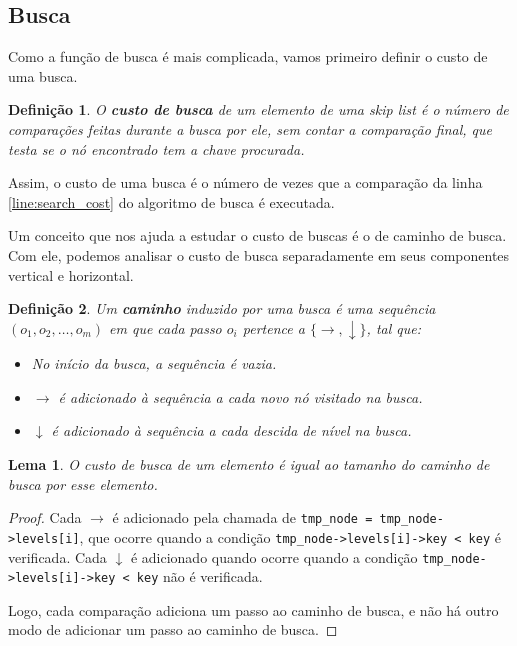 \documentclass[paper=a4, fontsize=11pt]{scrartcl} %
\newtheorem{definition}{Definição}
\newtheorem{lemma}[theorem]{Lema}
\numberwithin{equation}{section}
\numberwithin{figure}{section}
\numberwithin{table}{section}
\numberwithin{definition}{section}
\numberwithin{theorem}{section}
\numberwithin{property}{section}
\numberwithin{proposition}{section}
\renewcommand{\sl}{\textit{skip list}\xspace}
\begin{document}
\subsection{Busca}

Como a função de busca é mais complicada, vamos primeiro definir o custo de uma busca.

\begin{definition}

O \textbf{custo de busca} de um elemento de uma \sl é o número de comparações feitas durante a busca por ele, sem
contar a comparação final, que testa se o nó encontrado tem a chave procurada.

\end{definition}

Assim, o custo de uma busca é o número de vezes que a comparação da linha \ref{line:search_cost} do algoritmo
de busca é executada.

Um conceito que nos ajuda a estudar o custo de buscas é o de caminho de busca. Com ele, podemos analisar o
custo de busca separadamente em seus componentes vertical e horizontal.

\begin{definition}

Um \textbf{caminho} induzido por uma busca é uma sequência $(o_1, o_2, \ldots, o_m)$ 
em que cada passo $o_i$ pertence a $\{\rightarrow, \downarrow\}$, tal que:

\begin{itemize}[noitemsep]
  \item No início da busca, a sequência é vazia.
  \item $\rightarrow$ é adicionado à sequência a cada novo nó visitado na busca.
  \item $\downarrow$ é adicionado à sequência a cada descida de nível na busca.
\end{itemize}

\end{definition}

\begin{lemma} \label{lemma:custo_busca_caminho}
O custo de busca de um elemento é igual ao tamanho do caminho de busca por esse elemento.
\end{lemma}

\begin{proof}
Cada $\rightarrow$ é adicionado pela chamada de \verb|tmp_node = tmp_node->levels[i]|, que ocorre quando a condição
\verb|tmp_node->levels[i]->key < key| é verificada. 
Cada $\downarrow$ é adicionado quando ocorre quando a condição \verb|tmp_node->levels[i]->key < key| 
não é verificada.

Logo, cada comparação adiciona um passo ao caminho de busca, e não há outro modo de adicionar um passo ao
caminho de busca.
\end{proof}
\end{document}

